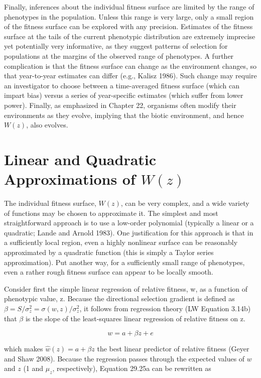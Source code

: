 \documentclass{article}
\begin{document}
Finally, inferences about the individual fitness surface are limited by the range of phenotypes in the population. Unless this range is very large, only a small region of the fitness surface can be explored with any precision. Estimates of the fitness surface at the tails of the current phenotypic distribution are extremely imprecise yet potentially very informative, as they suggest patterns of selection for populations at the margins of the observed range of phenotypes. A further complication is that the fitness surface can change as the environment changes, so that year-to-year estimates can differ (e.g., Kalisz 1986). Such change may require an investigator to choose between a time-averaged fitness surface (which can impart bias) versus a series of year-specific estimates (which suffer from lower power). Finally, as emphasized in Chapter 22, organisms often modify their environments as they evolve, implying that the biotic environment, and hence  $ W(z) $, also evolves.

\section{Linear and Quadratic Approximations of  $ W(z) $}
The individual fitness surface,  $ W(z) $, can be very complex, and a wide variety of functions may be chosen to approximate it. The simplest and most straightforward approach is to use a low-order polynomial (typically a linear or a quadratic; Lande and Arnold 1983). One justification for this approach is that in a sufficiently local region, even a highly nonlinear surface can be reasonably approximated by a quadratic function (this is simply a Taylor series approximation). Put another way, for a sufficiently small range of phenotypes, even a rather rough fitness surface can appear to be locally smooth.

Consider first the simple linear regression of relative fitness, w, as a function of phenotypic value, z. Because the directional selection gradient is defined as  $ \beta = S/\sigma_z^2 = \sigma(w, z)/\sigma_z^2 $, it follows from regression theory (LW Equation 3.14b) that  $ \beta $ is the slope of the least-squares linear regression of relative fitness on z.

\begin{equation}
w=a+\beta z+e
\tag{29.25a}
\label{eq:29_25a}
\end{equation}

which makes  $ \widehat{w}(z) = a + \beta z $ the best linear predictor of relative fitness (Geyer and Shaw 2008). Because the regression passes through the expected values of  $ w $ and  $ z $ (1 and  $ \mu_z $, respectively), Equation 29.25a can be rewritten as
\end{document}
